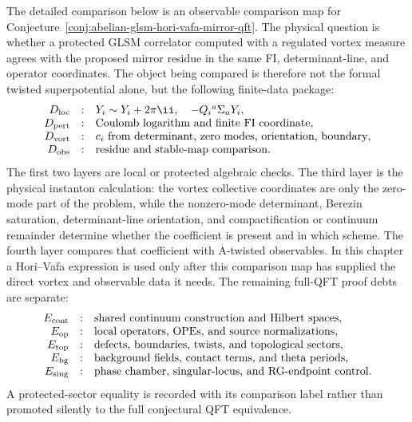 The detailed comparison below is an observable comparison map for
Conjecture~\ref{conj:abelian-glsm-hori-vafa-mirror-qft}.  The physical question
is whether a protected GLSM correlator computed with a regulated vortex measure
agrees with the proposed mirror residue in the same FI, determinant-line, and
operator coordinates.  The object being compared is therefore not the formal
twisted superpotential alone, but the following finite-data package:
\[
  \begin{array}{rcl}
    D_{\rm loc} &:& Y_i\sim Y_i+2\pi\ii,\quad -Q_i{}^a\Sigma_aY_i,\\
    D_{\rm pert} &:& \hbox{Coulomb logarithm and finite FI coordinate},\\
    D_{\rm vort} &:& c_i\hbox{ from determinant, zero modes, orientation, boundary},\\
    D_{\rm obs} &:& \hbox{residue and stable-map comparison.}
  \end{array}
\]
The first two layers are local or protected algebraic checks.  The third layer
is the physical instanton calculation: the vortex collective coordinates are
only the zero-mode part of the problem, while the nonzero-mode determinant,
Berezin saturation, determinant-line orientation, and compactification or
continuum remainder determine whether the coefficient is present and in which
scheme.  The fourth layer compares that coefficient with A-twisted observables.
In this chapter a Hori--Vafa expression is used only after this comparison map
has supplied the direct vortex and observable data it needs.  The remaining
full-QFT proof debts are separate:
\[
  \begin{array}{rcl}
    E_{\rm cont} &:& \hbox{shared continuum construction and Hilbert spaces},\\
    E_{\rm op} &:& \hbox{local operators, OPEs, and source normalizations},\\
    E_{\rm top} &:& \hbox{defects, boundaries, twists, and topological sectors},\\
    E_{\rm bg} &:& \hbox{background fields, contact terms, and theta periods},\\
    E_{\rm sing} &:& \hbox{phase chamber, singular-locus, and RG-endpoint control}.
  \end{array}
\]
A protected-sector equality is recorded with its comparison label rather than
promoted silently to the full conjectural QFT equivalence.

